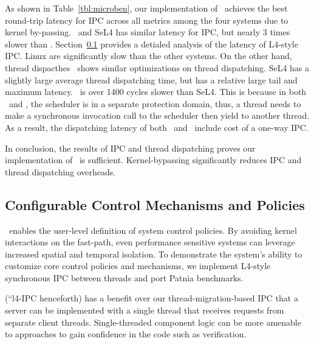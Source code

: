 As shown in Table~\ref{tbl:microben}, our implementation of \name\ achieves the best round-trip latency for IPC across all metrics among the four systems due to kernel by-passing.
\cos\ and SeL4 has similar latency for IPC, but nearly 3 times slower than \name .
Section~\ref{ss:eval_config} provides a detialed analysis of the latency of L4-style IPC.
Linux {\pipes} are significantly slow than the other systems.
On the other hand, thread dispacthes \name\ shows similar optimizations on thread dispatching.
SeL4 has a slightly large average thread dispatching time, but has a relative large tail and maximum latency.
\cos\ is over 1400 cycles slower than SeL4.
This is because in both \name\ and \cos , the scheduler is in a separate protection domain, thus, a thread needs to make a synchronous invocation call to the scheduler then yield to another thread.
As a result, the dispatching latency of both \cos\ and \name\ include cost of a one-way IPC.

In conclusion, the results of IPC and thread dispatching proves our implementation of \name\ is sufficient.
Kernel-bypassing significantly reduces IPC and thread dispatching overheads.


\subsection{Configurable Control Mechanisms and Policies}
\label{ss:eval_config}

\name\ enables the user-level definition of system control policies.
By avoiding kernel interactions on the fast-path, even performance sensitive systems can leverage increased spatial and temporal isolation.
To demonstrate the system's ability to customize core control policies and mechanisms, we implement L4-style synchronous IPC between threads and port Patnia benchmarks.

 (``l4-IPC henceforth) has a benefit over our thread-migration-based IPC that a server can be implemented with a single thread that receives requests from separate client threads.
Single-threaded component logic can be more amenable to approaches to gain confidence in the code such as verification.

